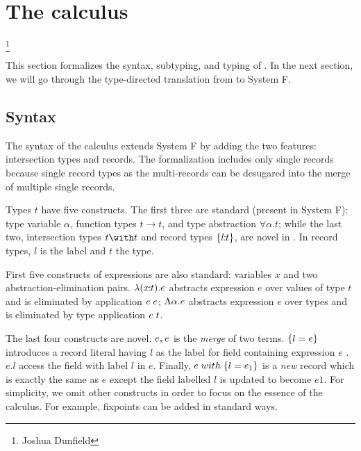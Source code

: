 \section{The \name calculus}

\footnote{Joshua Dunfield}

This section formalizes the syntax, subtyping, and typing of \name. In the next
section, we will go through the type-directed translation from \name to System
F.


\subsection{Syntax}

The syntax of the \name calculus extends System F by adding the two features:
intersection types and records. The formalization includes only single records
because single record types as the multi-records can be desugared into the merge
of multiple single records.



Types $ t $ have five constructs. The first three are standard (present in
System F): type variable $ \alpha $, function types $ t \to t $, and type
abstraction $ \forall \alpha. t $; while the last two, intersection types
$ t \with t $ and record types $ \{ l \!\!:\!\! t \} $, are novel in \Name. In
record types, $ l $ is the label and $ t $ the type.

First five constructs of expressions are also standard: variables $ x $ and two
abstraction-elimination pairs. $ \lambda (x \!\!:\!\! t). e $ abstracts expression
$ e $ over values of type $ t $ and is eliminated by application $ e \; e $;
$ \Lambda \alpha. e $ abstracts expression $ e $ over types and is eliminated by
type application $ e \; t $.

The last four constructs are novel. $ e ,\!\!, e $ is the \emph{merge} of two
terms. $ \{ l = e \} $ introduces a record literal having $ l $ as the
label for field containing expression $ e $ . $ e.l $ access the field with
label $ l $ in $ e $. Finally, $ e \; with \; \{ l = e_1 \} $ is a \emph{new}
record which is exactly the same as $ e $ except the field labelled $ l $ is
updated to become $ e1 $. For simplicity, we omit other constructs in order to
focus on the essence of the calculus. For example, fixpoints can be added in
standard ways.

